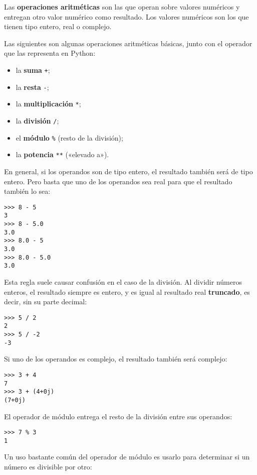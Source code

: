 Las \textbf{operaciones aritméticas} son las que operan sobre valores
numéricos y entregan otro valor numérico como resultado. Los valores
numéricos son los que tienen tipo entero, real o complejo.

Las siguientes son algunas operaciones aritméticas básicas, junto con el
operador que las representa en Python:

\begin{itemize}
\item
  la \textbf{suma} \lstinline!+!;
\item
  la \textbf{resta} \lstinline!-!;
\item
  la \textbf{multiplicación} \lstinline!*!;
\item
  la \textbf{división} \lstinline!/!;
\item
  el \textbf{módulo} \lstinline!%! (resto de la división);
\item
  la \textbf{potencia} \lstinline!**! («elevado a»).
\end{itemize}

En general, si los operandos son de tipo entero, el resultado también
será de tipo entero. Pero basta que uno de los operandos sea real para
que el resultado también lo sea:

\begin{lstlisting}
>>> 8 - 5
3
>>> 8 - 5.0
3.0
>>> 8.0 - 5
3.0
>>> 8.0 - 5.0
3.0
\end{lstlisting}

Esta regla suele causar confusión en el caso de la división. Al dividir
números enteros, el resultado siempre es entero, y es igual al resultado
real \textbf{truncado}, es decir, sin su parte decimal:

\begin{lstlisting}
>>> 5 / 2
2
>>> 5 / -2
-3
\end{lstlisting}

Si uno de los operandos es complejo, el resultado también será complejo:

\begin{lstlisting}
>>> 3 + 4
7
>>> 3 + (4+0j)
(7+0j)
\end{lstlisting}

El operador de módulo entrega el resto de la división entre sus
operandos:

\begin{lstlisting}
>>> 7 % 3
1
\end{lstlisting}

Un uso bastante común del operador de módulo es usarlo para determinar
si un número es divisible por otro:

